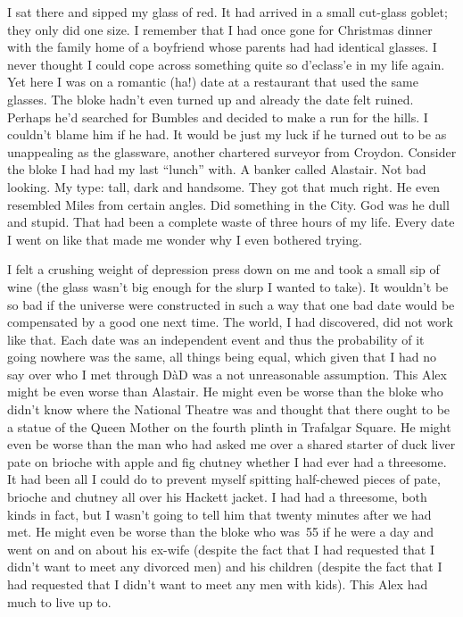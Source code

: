 I sat there and sipped my glass of red. It had arrived in a small
cut-glass goblet; they only did one size. I remember that I had once
gone for Christmas dinner with the family home of a boyfriend whose
parents had had identical glasses. I never thought I could cope
across something quite so d{'e}class{'e} in my life again. Yet here I
was on a romantic (ha!) date at a restaurant that used the same
glasses. The bloke hadn't even turned up and already the date felt
ruined. Perhaps
he'd searched for Bumbles and decided to make a run for the hills. I
couldn't blame him if he had. It would be just my luck if he turned out to be as
unappealing as the glassware, another chartered surveyor from
Croydon. Consider the bloke I had had my last ``lunch'' with.
A banker called Alastair. Not bad looking. My type: tall, dark and
handsome. They got that much right. He even resembled Miles from certain angles. Did something in the City. {\twelveit
God\/} was he dull and stupid. That had been a complete waste of
three hours of my life. Every date I went on like that made me wonder
why I even bothered trying.

I felt a crushing weight of depression press down on me and took a
small sip of wine (the glass wasn't big enough for the slurp I
wanted to take). It
wouldn't be so bad if the universe were constructed in such a way
that one bad date would be compensated by a good one next time. The
world, I had discovered, did not work like that. Each date was an independent event
and thus the probability of it going nowhere was the same, all
things being equal, which given that I had no say over who I met
through DàD was a not unreasonable assumption. This Alex might be even worse than Alastair. He might even be worse than the bloke who didn't know where the National Theatre
was and thought that there ought to be a statue of the Queen Mother on the fourth plinth in
Trafalgar Square. He might even be worse than the man who had asked me over a shared
starter of duck liver pate on brioche with apple and fig chutney
whether I had ever had a threesome. It had been all I could do to prevent
myself spitting half-chewed pieces of pate, brioche and chutney all
over his Hackett jacket. I had had a threesome, both kinds in fact, but I
wasn't going to tell him that twenty minutes after we had met. He might even be worse than the bloke who was~55 if he were a day and went on and on about his ex-wife (despite the fact that I had requested that I didn't
want to meet any divorced men) and his children (despite the fact
that I had requested that I didn't want to meet any men with kids).
This Alex had much to live up to.

